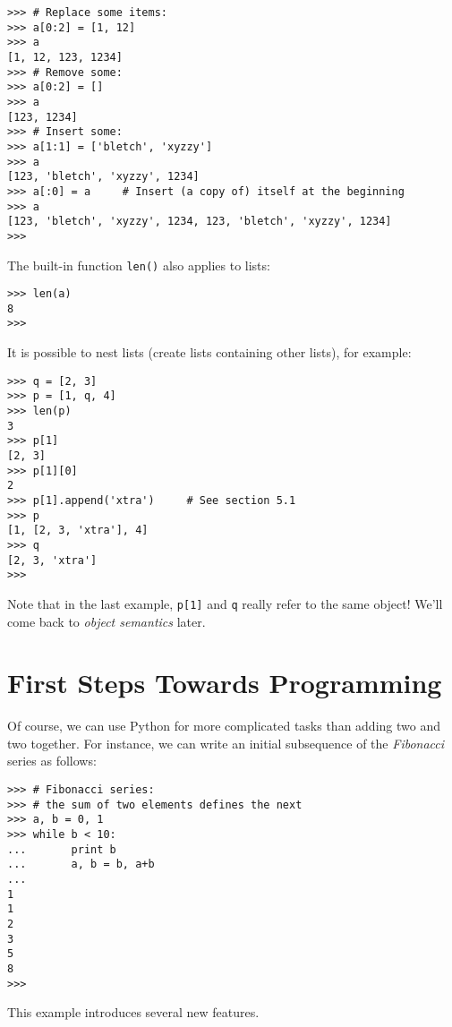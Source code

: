 \bcode\begin{verbatim}
>>> # Replace some items:
>>> a[0:2] = [1, 12]
>>> a
[1, 12, 123, 1234]
>>> # Remove some:
>>> a[0:2] = []
>>> a
[123, 1234]
>>> # Insert some:
>>> a[1:1] = ['bletch', 'xyzzy']
>>> a
[123, 'bletch', 'xyzzy', 1234]
>>> a[:0] = a     # Insert (a copy of) itself at the beginning
>>> a
[123, 'bletch', 'xyzzy', 1234, 123, 'bletch', 'xyzzy', 1234]
>>> 
\end{verbatim}\ecode
%
The built-in function {\tt len()} also applies to lists:

\bcode\begin{verbatim}
>>> len(a)
8
>>> 
\end{verbatim}\ecode
%
It is possible to nest lists (create lists containing other lists),
for example:

\bcode\begin{verbatim}
>>> q = [2, 3]
>>> p = [1, q, 4]
>>> len(p)
3
>>> p[1]
[2, 3]
>>> p[1][0]
2
>>> p[1].append('xtra')     # See section 5.1
>>> p
[1, [2, 3, 'xtra'], 4]
>>> q
[2, 3, 'xtra']
>>>
\end{verbatim}\ecode
%
Note that in the last example, {\tt p[1]} and {\tt q} really refer to
the same object!  We'll come back to {\em object semantics} later.

\section{First Steps Towards Programming}

Of course, we can use Python for more complicated tasks than adding
two and two together.  For instance, we can write an initial
subsequence of the {\em Fibonacci} series as follows:

\bcode\begin{verbatim}
>>> # Fibonacci series:
>>> # the sum of two elements defines the next
>>> a, b = 0, 1
>>> while b < 10:
...       print b
...       a, b = b, a+b
... 
1
1
2
3
5
8
>>> 
\end{verbatim}\ecode
%
This example introduces several new features.

